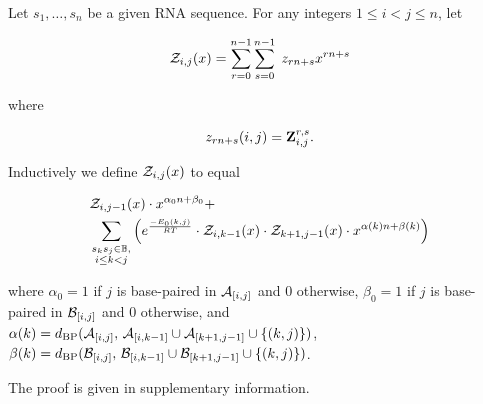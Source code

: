 \begin{theorem}
Let $s_1,\dots,s_n$ be a given RNA sequence.
For any integers $1 \leq i < j \leq n$, let

\begin{align}
{\mathcal Z}_{i,j}(x) = \sum_{r=0}^{n-1} \sum_{s=0}^{n-1}\; z_{rn+s} x^{rn+s}
\end{align}

where

\begin{align}
z_{rn+s}(i,j) = {\bf Z}^{r,s}_{i,j}.
\end{align}

Inductively we define ${\mathcal Z}_{i,j}(x)$ to equal

\begin{align}
\label{eqn:polynomialRecursionNussJac}
&\emZof{i,j-1}{x} \cdot x^{\alpha_0n+\beta_0} + \\
&\sum_{\substack{s_k s_j \in \bpSet,\\i\le k<j}}
\left(e^{\frac{-E_0(k,j)}{RT}}\cdot
\emZof{i,k-1}{x} \cdot \emZof{k+1,j-1}{x}\cdot x^{\alpha(k)n+\beta(k)} \right)
\nonumber
\end{align}

where $\alpha_0 = 1$ if $j$ is base-paired in $\mathcal A_{[i,j]}$ and $0$ otherwise,
$\beta_0 = 1$ if $j$ is base-paired in $\mathcal B_{[i,j]}$ and $0$ otherwise, and
$\alpha(k) =
d_{\text{BP}}(\mathcal A_{[i,j]},\,\mathcal A_{[i,k-1]} \cup \mathcal A_{[k+1,j-1]} \cup \{ (k,j) \})$,
$\beta(k) =
d_{\text{BP}}(\mathcal B_{[i,j]},\,\mathcal B_{[i,k-1]} \cup \mathcal B_{[k+1,j-1]} \cup \{ (k,j) \})$.

The proof is given in supplementary information.
\end{theorem}

